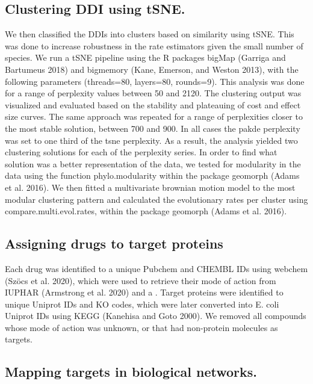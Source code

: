 \documentclass[]{elsarticle} %
\begin{document}
\hypertarget{clustering-ddi-using-tsne.}{%
\subsection{Clustering DDI using tSNE.}\label{clustering-ddi-using-tsne.}}

We then classified the DDIs into clusters based on similarity using tSNE. This was done to increase robustness in the rate estimators given the small number of species. We run a tSNE pipeline using the R packages bigMap (Garriga and Bartumeus 2018) and bigmemory (Kane, Emerson, and Weston 2013), with the following parameters (threads=80, layers=80, rounds=9). This analysis was done for a range of perplexity values between 50 and 2120. The clustering output was visualized and evaluated based on the stability and plateauing of cost and effect size curves. The same approach was repeated for a range of perplexities closer to the most stable solution, between 700 and 900. In all cases the pakde perplexity was set to one third of the tsne perplexity. As a result, the analysis yielded two clustering solutions for each of the perplexity series. In order to find what solution was a better representation of the data, we tested for modularity in the data using the function phylo.modularity within the package geomorph (Adams et al. 2016). We then fitted a multivariate brownian motion model to the most modular clustering pattern and calculated the evolutionary rates per cluster using compare.multi.evol.rates, within the package geomorph (Adams et al. 2016).

\hypertarget{assigning-drugs-to-target-proteins}{%
\subsection{Assigning drugs to target proteins}\label{assigning-drugs-to-target-proteins}}

Each drug was identified to a unique Pubchem and CHEMBL IDs using webchem (Szöcs et al. 2020), which were used to retrieve their mode of action from IUPHAR (Armstrong et al. 2020) and a . Target proteins were identified to unique Uniprot IDs and KO codes, which were later converted into E. coli Uniprot IDs using KEGG (Kanehisa and Goto 2000). We removed all compounds whose mode of action was unknown, or that had non-protein molecules as targets.

\hypertarget{mapping-targets-in-biological-networks.}{%
\subsection{Mapping targets in biological networks.}\label{mapping-targets-in-biological-networks.}}
\end{document}
